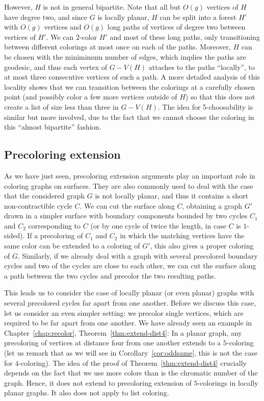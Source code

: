 \documentclass[12pt,twoside,openright,a4paper]{book}
\begin{document}
However, $H$ is not in general bipartite.  Note that all but $O(g)$ vertices of $H$ have degree two, and since $G$ is locally planar, $H$ can be split into a forest $H'$
with $O(g)$ vertices and $O(g)$ long paths of vertices of degree two between vertices of $H'$.  We can $2$-color $H'$ and most of these long
paths, only transitioning between different colorings at most once on each of the paths.  Moreover, $H$ can be chosen with the minimimum number
of edges, which implies the paths are geodesic, and thus each vertex of $G-V(H)$ attaches to the paths ``locally'',
to at most three consecutive vertices of such a path.  A more detailed analysis of this locality shows that we can transition between the
colorings at a carefully chosen point (and possibly color a few more vertices outside of $H$) so that this does not create a list of size
less than three in $G-V(H)$.  The idea for 5-choosability is similar but more involved, due to the fact that we cannot choose the coloring
in this ``almost bipartite'' fashion.

\subsection{Precoloring extension}

As we have just seen, precoloring extension arguments play an important role in coloring graphs on surfaces.
They are also commonly used to deal with the case that the considered graph $G$ is not locally planar, and thus it contains a short
non-contractible cycle $C$.  We can cut the surface along $C$, obtaining a graph $G'$ drawn in a simpler surface with
boundary components bounded by two cycles $C_1$ and $C_2$ corresponding to $C$ (or by one cycle of twice the length,
in case $C$ is $1$-sided).  If a precoloring of $C_1$ and $C_2$ in which the matching vertices have the same color
can be extended to a coloring of $G'$, this also gives a proper coloring of $G$.
Similarly, if we already deal with a graph with several precolored boundary cycles and two of the cycles
are close to each other, we can cut the surface along a path between the two cycles and precolor the two resulting paths.

This leads us to consider the case of locally planar (or even planar) graphs with several precolored cycles far apart from
one another.  Before we discuss this case, let us consider an even simpler setting: we precolor single vertices,
which are required to be far apart from one another.  We have already seen an example in Chapter~\ref{chap:recolor},
Theorem~\ref{thm:extend-dist4}: In a planar graph, any precoloring of vertices at distance four from one another extends to a $5$-coloring
(let us remark that as we will see in Corollary~\ref{cor:oddsame}, this is not the case for $4$-coloring).
The idea of the proof of Theorem~\ref{thm:extend-dist4} crucially depends on the fact that we use more colors than is the chromatic number
of the graph.  Hence, it does not extend to precoloring extension of $5$-colorings in locally planar graphs.
It also does not apply to list coloring.
\end{document}
